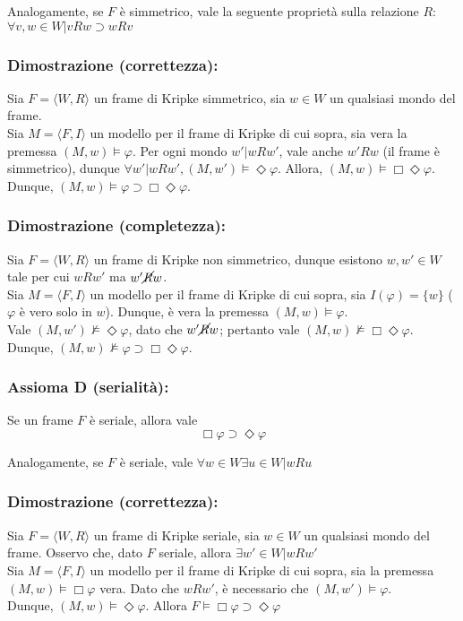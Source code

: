Analogamente, se $F$ è simmetrico, vale la seguente proprietà sulla relazione $R$: $\forall v, w \in W | vRw \supset wRv$

\subsubsection{Dimostrazione (correttezza):}
Sia $F = \langle W, R \rangle$ un frame di Kripke simmetrico, sia $w \in W$ un qualsiasi mondo del frame. \\
Sia $M = \langle F, I \rangle$ un modello per il frame di Kripke di cui sopra, sia vera la premessa $(M, w) \models \varphi$. Per ogni mondo $w' | wRw'$, vale anche $w'Rw$ (il frame è simmetrico), dunque $\forall w' | wRw', (M, w') \models \Diamond \varphi$. Allora, $(M, w) \models \Box \Diamond \varphi$.\\
Dunque, $(M, w) \models \varphi \supset \Box \Diamond \varphi$.

\subsubsection{Dimostrazione (completezza):}
Sia $F = \langle W, R \rangle$ un frame di Kripke non simmetrico, dunque esistono $w, w' \in W$ tale per cui $wRw'$ ma $w'\cancel{R}w$.\\
Sia $M = \langle F, I \rangle$ un modello per il frame di Kripke di cui sopra, sia $I(\varphi) = \{w\}$ ($\varphi$ è vero solo in $w$). Dunque, è vera la premessa $(M, w) \models \varphi$.\\
Vale $(M, w') \not \models \Diamond \varphi$, dato che $w'\cancel{R}w$; pertanto vale $(M, w) \not \models \Box \Diamond \varphi$.
Dunque, $(M, w) \not \models \varphi \supset \Box \Diamond \varphi$.

\subsubsection{Assioma D (serialità):} Se un frame $F$ è seriale, allora vale $$\Box \varphi \supset \Diamond \varphi$$

Analogamente, se $F$ è seriale, vale $\forall w \in W \exists u \in W | wRu$

\subsubsection{Dimostrazione (correttezza):}
Sia $F = \langle W, R \rangle$ un frame di Kripke seriale, sia $w \in W$ un qualsiasi mondo del frame. Osservo che, dato $F$ seriale, allora $\exists w' \in W | wRw'$\\
Sia $M = \langle F, I \rangle$ un modello per il frame di Kripke di cui sopra, sia la premessa $(M, w) \models \Box \varphi$ vera. Dato che $wRw'$, è necessario che $(M, w') \models \varphi$.\\
Dunque, $(M, w) \models \Diamond \varphi$. Allora $F \models \Box \varphi \supset \Diamond \varphi$

